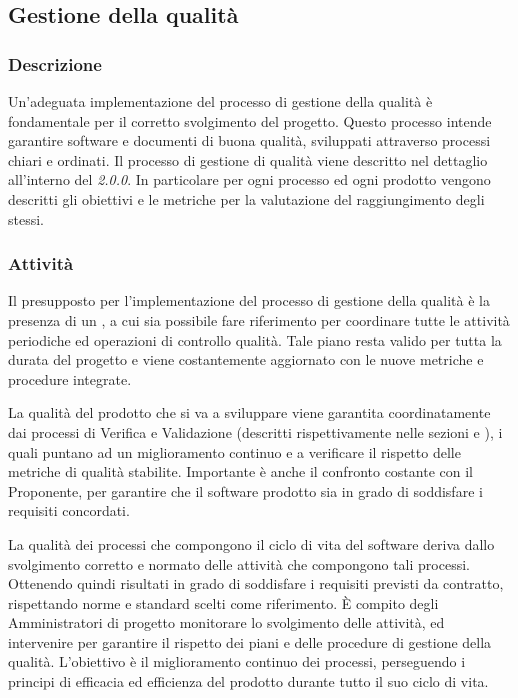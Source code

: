 \subsection{Gestione della qualità}
    \subsubsection{Descrizione}
      Un'adeguata implementazione del processo di gestione della qualità è fondamentale per il corretto svolgimento del progetto. Questo processo intende garantire software e documenti di buona qualità, sviluppati attraverso processi chiari e ordinati. Il processo di gestione di qualità viene descritto nel dettaglio all'interno del \textit{\PdQ{} 2.0.0}. In particolare per ogni processo ed ogni prodotto vengono descritti gli obiettivi e le metriche per la valutazione del raggiungimento degli stessi.
      
    \subsubsection{Attività}
       Il presupposto per l'implementazione del processo di gestione della qualità è la presenza di un \PdQ{}, a cui sia possibile fare riferimento per coordinare tutte le attività periodiche ed operazioni di controllo qualità. Tale piano resta valido per tutta la durata del progetto e viene costantemente aggiornato con le nuove metriche e procedure integrate.

      La qualità del prodotto che si va a sviluppare viene garantita coordinatamente dai processi di Verifica e Validazione (descritti rispettivamente nelle sezioni  e ), i quali puntano ad un miglioramento continuo e a verificare il rispetto delle metriche di qualità stabilite. Importante è anche il confronto costante con il Proponente, per garantire che il software prodotto sia in grado di soddisfare i requisiti concordati.

      La qualità dei processi che compongono il ciclo di vita del software deriva dallo svolgimento corretto e normato delle attività che compongono tali processi. Ottenendo quindi risultati in grado di soddisfare i requisiti previsti da contratto, rispettando norme e standard scelti come riferimento. È compito degli Amministratori di progetto monitorare lo svolgimento delle attività, ed intervenire per garantire il rispetto dei piani e delle procedure di gestione della qualità.
      L'obiettivo è il miglioramento continuo dei processi, perseguendo i principi di efficacia ed efficienza del prodotto durante tutto il suo ciclo di vita.   
	
